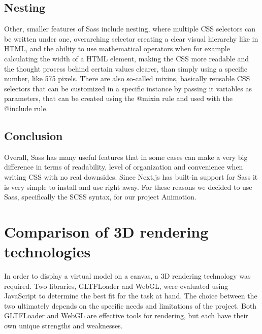\subsection{Nesting}
Other, smaller features of Sass include nesting, where multiple CSS selectors can be written under one, overarching selector creating a
clear visual hierarchy like in HTML, and the ability to use mathematical operators when for example calculating the width of a HTML
element, making the CSS more readable and the thought process behind certain values clearer, than simply using a specific number, like
575 pixels. There are also so-called mixins, basically reusable CSS selectors that can be customized in a specific instance by passing it
variables as parameters, that can be created using the @mixin rule and used with the @include rule. \cite{SassFeatures}

\subsection{Conclusion}
Overall, Sass has many useful features that in some cases can make a very big difference in terms of readability, level of organization and
convenience when writing CSS with no real downsides. Since Next.js has built-in support for Sass it is very simple to install and use right
away. For these reasons we decided to use Sass, specifically the SCSS syntax, for our project Animotion. \cite{NextjsCSSSupport}

\section{Comparison of 3D rendering technologies}
In order to display a virtual model on a canvas, a 3D rendering technology was required. Two libraries, 
GLTFLoader and WebGL, were evaluated using JavaScript to determine the best fit for the task at hand. 
The choice between the two ultimately depends on the specific needs and limitations of the project. 
Both GLTFLoader and WebGL are effective tools for rendering, but each have their own 
unique strengths and weaknesses.

